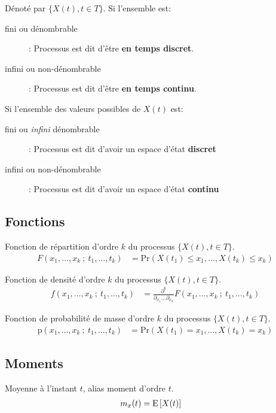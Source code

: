 \documentclass[10pt, french]{article}
\begin{document}
\begin{multicols*}{2}
Dénoté par $\{X(t), t \in T\}$.
Si l'ensemble est:
\begin{description}
	\item[fini ou dénombrable]: Processus est dit d'être \textbf{en temps discret}.
	\item[infini ou non-dénombrable]: Processus est dit d'être \textbf{en temps continu}.
\end{description}

Si l'ensemble des valeurs possibles de $X(t)$ est:
\begin{description}
	\item[fini ou \textit{infini} dénombrable]: Processus est dit d'avoir un espace d'état \textbf{discret}
	\item[infini ou non-dénombrable]: Processus est dit d'avoir un espace d'état \textbf{continu}
\end{description}

\subsection*{Fonctions}

Fonction de répartition d'ordre $k$ du processus $\{X(t), t \in T\}$.
	\begin{align*}
		F(x_{1}, \dots, x_{k} \ ; \ t_{1}, \dots, t_{k}) &= \text{Pr}(X(t_{1}) \le x_{1}, \dots, X(t_{k}) \le x_{k})
	\end{align*}
	
Fonction de densité d'ordre $k$ du processus $\{X(t), t \in T\}$.
	\begin{align*}
		f(x_{1}, \dots, x_{k} \ ; \ t_{1}, \dots, t_{k}) &= \frac{\partial^{k}}{\partial_{x_{1}} \dots \partial_{x_{k}}} F(x_{1}, \dots, x_{k} \ ; \ t_{1}, \dots, t_{k})
	\end{align*}

Fonction de probabilité de masse d'ordre $k$ du processus $\{X(t), t \in T\}$.
	\begin{align*}
		\text{p}(x_{1}, \dots, x_{k} \ ; \ t_{1}, \dots, t_{k}) &= \text{Pr}(X(t_{1}) = x_{1}, \dots, X(t_{k}) = x_{k})
	\end{align*}
	
\subsection*{Moments}

Moyenne à l'instant $t$, alias moment d'ordre $t$.
\begin{align*}
	m_{x}(t) &= \mathrm{E} \left[ X(t) \right]
\end{align*}


\end{multicols*}
\end{document}
